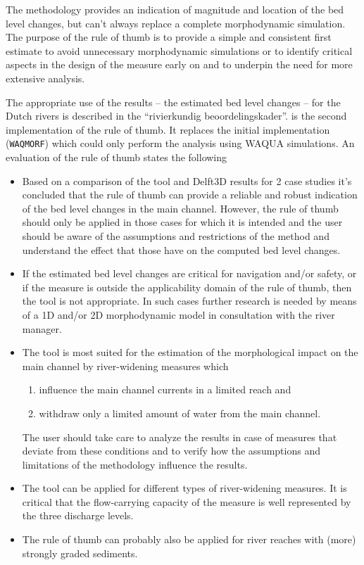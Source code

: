 The methodology provides an indication of magnitude and location of the bed level changes, but can't always replace a complete morphodynamic simulation.
The purpose of the rule of thumb is to provide a simple and consistent first estimate to avoid unnecessary morphodynamic simulations or to identify critical aspects in the design of the measure early on and to underpin the need for more extensive analysis.

The appropriate use of the results -- the estimated bed level changes -- for the Dutch rivers is described in the ``rivierkundig beoordelingskader''.
\dfastmi is the second implementation of the rule of thumb.
It replaces the initial implementation (\texttt{WAQMORF}) which could only perform the analysis using WAQUA simulations.
An evaluation of the rule of thumb \citep{Paarlberg2009} states the following

\begin{itemize}

\item Based on a comparison of the tool and Delft3D results for 2 case studies it's concluded that the rule of thumb can provide a reliable and robust indication of the bed level changes in the main channel.
However, the rule of thumb should only be applied in those cases for which it is intended and the user should be aware of the assumptions and restrictions of the method and understand the effect that those have on the computed bed level changes.

\item If the estimated bed level changes are critical for navigation and/or safety, or if the measure is outside the applicability domain of the rule of thumb, then the tool is not appropriate.
In such cases further research is needed by means of a 1D and/or 2D morphodynamic model in consultation with the river manager.

\item The tool is most suited for the estimation of the morphological impact on the main channel by river-widening measures which
\begin{enumerate}
\item influence the main channel currents in a limited reach and
\item withdraw only a limited amount of water from the main channel.
\end{enumerate}
The user should take care to analyze the results in case of measures that deviate from these conditions and to verify how the assumptions and limitations of the methodology influence the results.

\item The tool can be applied for different types of river-widening measures.
It is critical that the flow-carrying capacity of the measure is well represented by the three discharge levels.

\item The rule of thumb can probably also be applied for river reaches with (more) strongly graded sediments.
\end{itemize}

